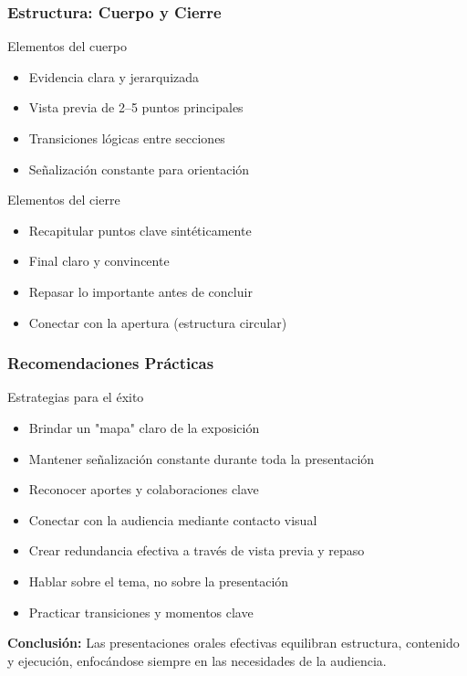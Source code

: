 \documentclass{beamer}
\begin{document}
	\begin{frame}
		\frametitle{Estructura: Cuerpo y Cierre}
		
		\begin{block}{Elementos del cuerpo}
			\begin{itemize}
				\item Evidencia clara y jerarquizada
				\item Vista previa de 2–5 puntos principales
				\item Transiciones lógicas entre secciones
				\item Señalización constante para orientación
			\end{itemize}
		\end{block}
		
		\begin{block}{Elementos del cierre}
			\begin{itemize}
				\item Recapitular puntos clave sintéticamente
				\item Final claro y convincente
				\item Repasar lo importante antes de concluir
				\item Conectar con la apertura (estructura circular)
			\end{itemize}
		\end{block}
	\end{frame}
	
	\begin{frame}
		\frametitle{Recomendaciones Prácticas}
		
		\begin{block}{Estrategias para el éxito}
			\begin{itemize}
				\item Brindar un "mapa" claro de la exposición
				\item Mantener señalización constante durante toda la presentación
				\item Reconocer aportes y colaboraciones clave
				\item Conectar con la audiencia mediante contacto visual
				\item Crear redundancia efectiva a través de vista previa y repaso
				\item Hablar sobre el tema, no sobre la presentación
				\item Practicar transiciones y momentos clave
			\end{itemize}
		\end{block}
		
		\vspace{0.5em}
		\alert{\textbf{Conclusión:}} Las presentaciones orales efectivas equilibran estructura, contenido y ejecución, enfocándose siempre en las necesidades de la audiencia.
	\end{frame}
	
\end{document}
